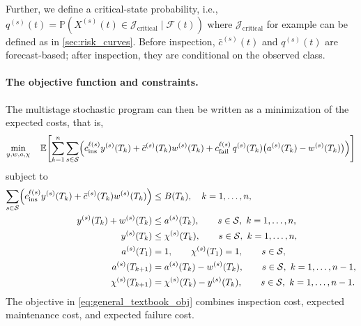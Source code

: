 Further, we define a critical-state probability, i.e., 
$
q^{(s)}(t) = \mathds P\left(X^{(s)}(t) \in \mathcal J_{\text{critical}} \mid \mathcal F(t) \right)
$ 
where $\mathcal J_{\text{critical}}$ for example can be defined as in \cref{sec:risk_curves}.
Before inspection, $\bar c^{(s)}(t)$ and $q^{(s)}(t)$ are forecast-based; after inspection, they are conditional on the observed class.

\paragraph{The objective function and constraints.}
The multistage stochastic program can then be written as a minimization of the expected costs, that is,
\begin{align}
\min_{y,w,a,\chi}\quad
\mathbb E\!\left[
\sum_{k=1}^n\sum_{s\in\mathcal S}
\Bigl(
c_{\mathrm{ins}}^{\ell(s)} y^{(s)}(T_k)
+ \bar c^{(s)}(T_k) w^{(s)}(T_k)
+ c_{\mathrm{fail}}^{\ell(s)}\,q^{(s)}(T_k)\bigl(a^{(s)}(T_k)-w^{(s)}(T_k)\bigr)
\Bigr)
\right]
\label{eq:general_textbook_obj}
\end{align}
subject to
\begin{align}
\sum_{s\in\mathcal S}
\Bigl(
c^{\ell(s)}_{\mathrm{ins}} y^{(s)} (T_k)
+ \bar c^{(s)}(T_k) w^{(s)}(T_k)
\Bigr)
&\le B(T_k),\quad k = 1,\dots,n,
\label{eq:general_textbook_budget}\\
y^{(s)}(T_k)+w^{(s)}(T_k)
&\le a^{(s)}(T_k),\qquad s\in\mathcal S,\  k = 1,\dots,n,
\label{eq:general_textbook_exclusive}\\
y^{(s)}(T_k)
&\le \chi^{(s)}(T_k),\qquad s\in\mathcal S,\  k = 1,\dots,n,
\label{eq:general_textbook_inspection}\\
a^{(s)}(T_1)&=1,\qquad \chi^{(s)}(T_1)=1, \qquad s\in\mathcal S,
\label{eq:general_textbook_initial}\\
a^{(s)}(T_{k+1})&=a^{(s)}(T_k)-w^{(s)}(T_k),\qquad s\in\mathcal S,\ k=1,\dots,n-1,
\label{eq:general_textbook_activity}\\
\chi^{(s)}(T_{k+1})&=\chi^{(s)}(T_k)-y^{(s)}(T_k),\qquad s\in\mathcal S,\ k=1,\dots,n-1.
\label{eq:general_textbook_uninspected}
\end{align}
The objective in \cref{eq:general_textbook_obj} combines inspection cost, expected maintenance cost, and expected failure cost. 

